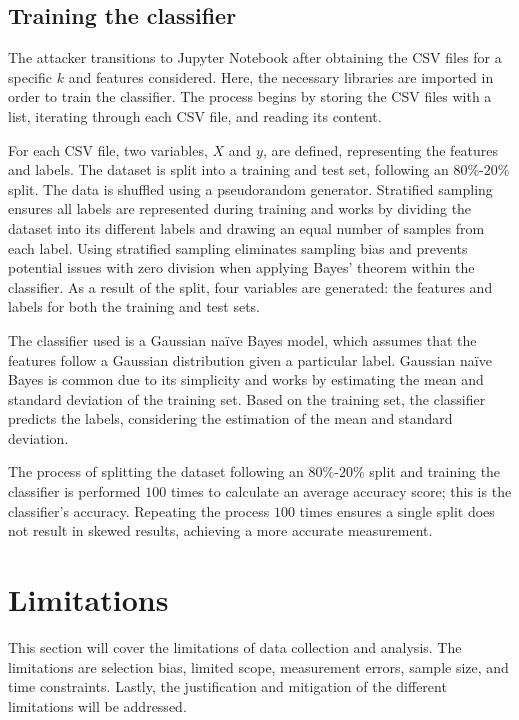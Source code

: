 \subsection{Training the classifier\label{subsec:training-methodology}}

The attacker transitions to Jupyter Notebook  after obtaining the CSV files for a specific $k$ and features considered. Here, the necessary libraries are imported in order to train the classifier. The process begins by storing the CSV files with a list, iterating through each CSV file, and reading its content.

For each CSV file, two variables, $X$ and $y$, are defined, representing the features and labels. The dataset is split into a training and test set, following an $80\%$-$20\%$ split. The data is shuffled using a pseudorandom generator. Stratified sampling ensures all labels are represented during training and works by dividing the dataset into its different labels and drawing an equal number of samples from each label. Using stratified sampling eliminates sampling bias and prevents potential issues with zero division when applying Bayes' theorem within the classifier. As a result of the split, four variables are generated: the features and labels for both the training and test sets.

The classifier used is a Gaussian naïve Bayes model, which assumes that the features follow a Gaussian distribution given a particular label. Gaussian naïve Bayes is common due to its simplicity and works by estimating the mean and standard deviation of the training set. Based on the training set, the classifier predicts the labels, considering the estimation of the mean and standard deviation.

The process of splitting the dataset following an $80\%$-$20\%$ split and training the classifier is performed $100$ times to calculate an average accuracy score; this is the classifier's accuracy. Repeating the process $100$ times ensures a single split does not result in skewed results, achieving a more accurate measurement.

\section{Limitations\label{sec:limitations-methodology}}

This section will cover the limitations of data collection and analysis. The limitations are selection bias, limited scope, measurement errors, sample size, and time constraints. Lastly, the justification and mitigation of the different limitations will be addressed.

